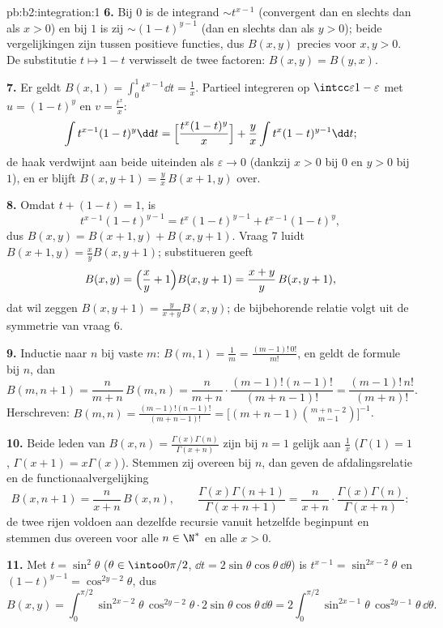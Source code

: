 \begin{solution}{pb:b2:integration:1}
\textbf{6.} Bij $0$ is de integrand $\sim t^{x-1}$ (convergent dan
en slechts dan als $x > 0$) en bij $1$ is zij $\sim (1-t)^{y-1}$
(dan en slechts dan als $y > 0$); beide vergelijkingen zijn tussen
positieve functies, dus  $B(x,y)$ precies voor $x, y >
0$. De substitutie $t \mapsto 1 - t$ verwisselt de twee factoren:
$B(x,y) = B(y,x)$.

\textbf{7.} Er geldt $B(x,1) = \int_0^1 t^{x-1}\dd t = \frac1x$.
Partieel integreren op $\intcc\varepsilon{1-\varepsilon}$ met $u =
(1-t)^y$ en $v = \frac{t^x}{x}$:
\[
\int t^{x-1}(1-t)^{y}\dd t
= \Bigl[\frac{t^x(1-t)^y}{x}\Bigr]
+ \frac{y}{x}\int t^{x}(1-t)^{y-1}\dd t ;
\]
de haak verdwijnt aan beide uiteinden als $\varepsilon \to 0$
(dankzij $x > 0$ bij $0$ en $y > 0$ bij $1$), en er blijft $B(x,
y+1) = \frac yx\,B(x+1, y)$ over.

\textbf{8.} Omdat $t + (1-t) = 1$, is
\[
t^{x-1}(1-t)^{y-1} = t^{x}(1-t)^{y-1} + t^{x-1}(1-t)^{y},
\]
dus $B(x,y) = B(x+1,y) + B(x,y+1)$. Vraag 7 luidt $B(x+1,y) =
\frac xy B(x,y+1)$; substitueren geeft
\[
B(x,y) = \Bigl(\frac xy + 1\Bigr)B(x,y+1)
= \frac{x+y}{y}\,B(x,y+1),
\]
dat wil zeggen $B(x,y+1) = \frac{y}{x+y}B(x,y)$; de bijbehorende
relatie volgt uit de symmetrie van vraag 6.

\textbf{9.} Inductie naar $n$ bij vaste $m$: $B(m,1) = \frac1m =
\frac{(m-1)!\,0!}{m!}$, en geldt de formule bij $n$, dan
\[
B(m, n+1) = \frac{n}{m+n}\,B(m,n)
= \frac{n}{m+n}\cdot\frac{(m-1)!(n-1)!}{(m+n-1)!}
= \frac{(m-1)!\,n!}{(m+n)!} .
\]
Herschreven: $B(m,n) = \frac{(m-1)!(n-1)!}{(m+n-1)!} =
\bigl[(m+n-1)\binom{m+n-2}{m-1}\bigr]^{-1}$.

\textbf{10.} Beide leden van $B(x,n) =
\frac{\Gamma(x)\Gamma(n)}{\Gamma(x+n)}$ zijn bij $n = 1$ gelijk aan
$\frac1x$ ($\Gamma(1) = 1$, $\Gamma(x+1) = x\Gamma(x)$). Stemmen
zij overeen bij $n$, dan geven de afdalingsrelatie en de
functionaalvergelijking
\[
B(x, n+1) = \frac{n}{x+n}\,B(x,n), \qquad
\frac{\Gamma(x)\Gamma(n+1)}{\Gamma(x+n+1)}
= \frac{n}{x+n}\cdot
\frac{\Gamma(x)\Gamma(n)}{\Gamma(x+n)} :
\]
de twee rijen voldoen aan dezelfde recursie vanuit hetzelfde
beginpunt en stemmen dus overeen voor alle $n \in \N^*$ en alle $x
> 0$.

\textbf{11.} Met $t = \sin^2\theta$ ($\theta \in \intoo0{\pi/2}$,
$\dd t = 2\sin\theta\cos\theta\,\dd\theta$) is $t^{x-1} =
\sin^{2x-2}\theta$ en $(1-t)^{y-1} = \cos^{2y-2}\theta$, dus
\[
B(x,y) = \int_0^{\pi/2}\sin^{2x-2}\theta\,\cos^{2y-2}\theta
\cdot 2\sin\theta\cos\theta\,\dd\theta
= 2\int_0^{\pi/2}\sin^{2x-1}\theta\,\cos^{2y-1}\theta\,
\dd\theta .
\]


\end{solution}
